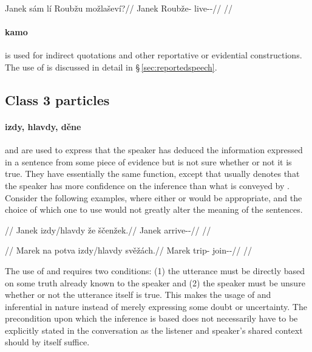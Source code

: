 \pex
\begingl
	\gla Janek sám lí Roubžu možlaševí?//
	\glb Janek \Excl{} \Q{} Roubže-\Ins{} live-\Av{}-\Cont{}//
	\glft {}//
\endgl
\xe

\paragraph{kamo}  is used for indirect quotations and other
reportative or evidential constructions. The use of  is discussed in
detail in \S\,\ref{sec:reportedspeech}.

\subsection{Class 3 particles}\label{sec:class3-particles}

\paragraph{izdy, hlavdy, děne}  and  are used to express
that the speaker has deduced the information expressed in a sentence from some
piece of evidence but is not sure whether or not it is true. They have
essentially the same function, except that  usually denotes that
the speaker has more confidence on the inference than what is conveyed by
. Consider the following examples, where either  or
 would be appropriate, and the choice of which one to use would not
greatly alter the meaning of the sentences.

\pex 
\begingl
	\glpreamble {}//
	\gla Janek izdy/hlavdy že ščenžek.//
	\glb Janek \Infer{} \Pfv{} arrive-\Av{}-\Pf{}//
	\glft {}//
\endgl
\xe

\pex
\begingl
	\glpreamble {}//
	\gla Marek na potva izdy/hlavdy svěžách.//
	\glb Marek \Loc{} trip-\Acc{} \Infer{} join-\Av{}-\Ctp{}//
	\glft {}//
\endgl
\xe

The use of  and  requires two conditions: (1) the
utterance must be directly based on some truth already known to the speaker and
(2) the speaker must be unsure whether or not the utterance itself is true. This
makes the usage of  and  inferential in nature instead of
merely expressing some doubt or uncertainty. The precondition upon which the
inference is based does not necessarily have to be explicitly stated in the
conversation as the listener and speaker's shared context should by itself
suffice.

